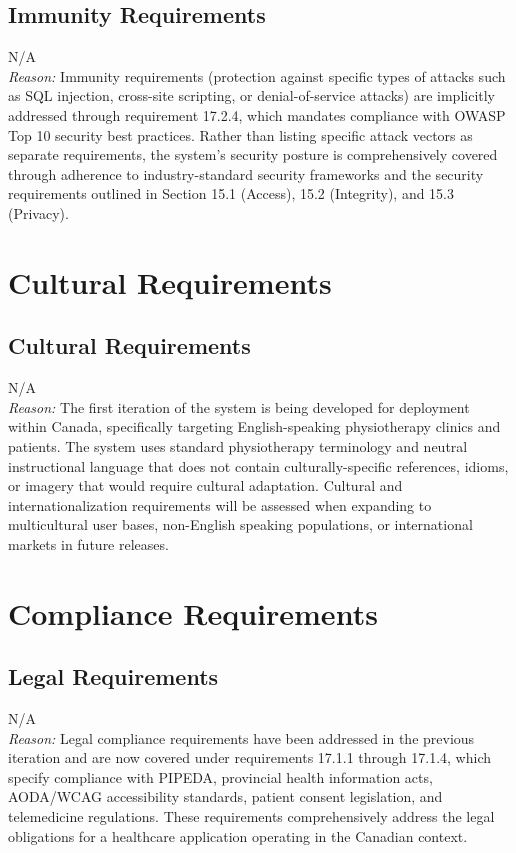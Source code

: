 \documentclass[12pt]{article}
\begin{document}
\subsection{Immunity Requirements}
\noindent N/A \\
\textit{Reason:} Immunity requirements (protection against specific types of attacks such as SQL injection, cross-site scripting, or denial-of-service attacks) are implicitly addressed through requirement 17.2.4, which mandates compliance with OWASP Top 10 security best practices. Rather than listing specific attack vectors as separate requirements, the system's security posture is comprehensively covered through adherence to industry-standard security frameworks and the security requirements outlined in Section 15.1 (Access), 15.2 (Integrity), and 15.3 (Privacy).

\section{Cultural Requirements}

\subsection{Cultural Requirements}
\noindent N/A \\
\textit{Reason:} The first iteration of the system is being developed for deployment within Canada, specifically targeting English-speaking physiotherapy clinics and patients. The system uses standard physiotherapy terminology and neutral instructional language that does not contain culturally-specific references, idioms, or imagery that would require cultural adaptation. Cultural and internationalization requirements will be assessed when expanding to multicultural user bases, non-English speaking populations, or international markets in future releases.

\section{Compliance Requirements}

\subsection{Legal Requirements}
\noindent N/A \\
\textit{Reason:} Legal compliance requirements have been addressed in the previous iteration and are now covered under requirements 17.1.1 through 17.1.4, which specify compliance with PIPEDA, provincial health information acts, AODA/WCAG accessibility standards, patient consent legislation, and telemedicine regulations. These requirements comprehensively address the legal obligations for a healthcare application operating in the Canadian context.
\end{document}

